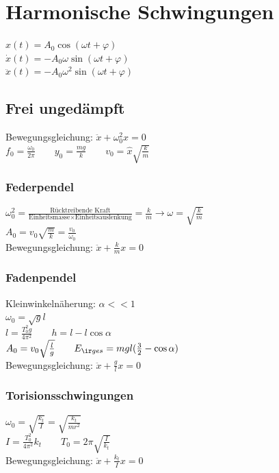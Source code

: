 \documentclass[german]{latex4ei/latex4ei_sheet}
\begin{document}
\section{Harmonische Schwingungen}
$x(t)=A_0\cos(\omega t + \varphi)$ \\
$\dot{x}(t)=-A_0\omega\sin(\omega t + \varphi)$\\
$\ddot{x}(t)=-A_0\omega^2\sin(\omega t + \varphi)$

\subsection{Frei ungedämpft}
Bewegungsgleichung: $\ddot{x}+\omega_0^2x=0$\\
$f_0=\frac{\omega_0}{2\pi} \qquad y_0=\frac{mg}{k} \qquad v_0 = \hat{x}\sqrt{\frac{k}{m}}$
\begin{sectionbox}
\subsubsection{Federpendel}
$\omega_0^2=\frac{\text{Rücktreibende Kraft}}{\text{Einheitsmasse} \times \text{Einheitsauslenkung}}=\frac{k}{m} \rightarrow \omega = \sqrt{\frac{k}{m}}$\\
$A_0=v_0\sqrt{\frac{m}{k}}=\frac{v_0}{\omega_0}$\\
Bewegungsgleichung: $\ddot{x}+\frac{k}{m}x=0$
\subsubsection{Fadenpendel}
Kleinwinkelnäherung: $\alpha << 1$\\
$\omega_0=\sqrt{g}{l}$\\
$l=\frac{T_0^2g}{4\pi^2} \qquad h=l-l\cos \alpha$\\
$A_0 = v_0 \sqrt{\frac{l}{g}} \qquad E_{\ir ges} = mgl(\frac{3}{2}-\cos \alpha)$\\
Bewegungsgleichung: $\ddot{x}+\frac{g}{l}x=0$
\subsubsection{Torisionsschwingungen}
$\omega_0 = \sqrt{\frac{k_t}{I}}=\sqrt{\frac{k_t}{mr^2}}$\\
$I=\frac{T_0^2}{4\pi^2}k_t \qquad T_0=2\pi \sqrt{\frac{I}{k_t}}$\\
Bewegungsgleichung: $\ddot{x}+\frac{k_t}{I}x=0$
\end{sectionbox}
\end{document}
